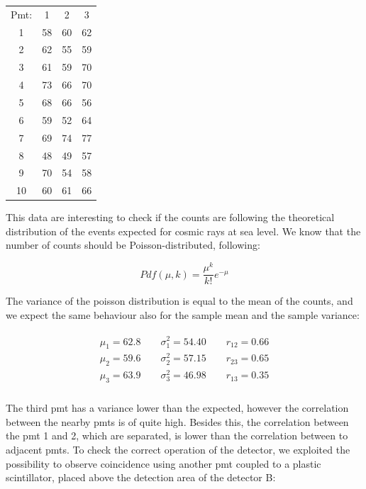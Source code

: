 \documentclass[10pt,a4paper]{article}
\begin{document}
\begin{center}
\begin{tabular}{|c|c|c|c|}
\hline 
Pmt: & 1 & 2 & 3 \\ 

1 & 58 & 60 & 62 \\ 
\hline 
2 & 62 & 55 & 59 \\ 
\hline 
3 & 61 & 59 & 70 \\ 
\hline 
4 & 73 & 66 & 70 \\ 
\hline 
5 & 68 & 66 & 56 \\ 
\hline 
6 & 59 & 52 & 64 \\ 
\hline 
7 & 69 & 74 & 77 \\ 
\hline 
8 & 48 & 49 & 57  \\ 
\hline 
9 & 70 & 54 & 58 \\ 
\hline 
10 & 60 & 61 & 66\\
\hline
\end{tabular} 

\end{center}

This data are interesting to check if the counts are following the theoretical distribution of the events expected for cosmic rays at sea level. We know that the number of counts should be Poisson-distributed, following:

\begin{equation}
Pdf(\mu,k) =  \frac{\mu^{k}}{k!} e^{-\mu}
\end{equation}

The variance of the poisson distribution is equal to the mean of the counts, and we expect the same behaviour also for the sample mean and the sample variance:

\begin{align*}
\begin{split}
\mu_{1} = 62.8	\qquad \sigma^{2}_{1} = 54.40 \qquad r_{12} = 0.66\\
\mu_{2} = 59.6	\qquad \sigma^{2}_{2} = 57.15 \qquad r_{23} = 0.65\\
\mu_{3} = 63.9	\qquad \sigma^{2}_{3} = 46.98 \qquad r_{13} = 0.35 \\
\end{split}
\end{align*}

The third pmt has a variance lower than the expected, however the correlation between the nearby pmts is of quite high. Besides this, the correlation between the pmt 1 and 2, which are separated, is lower than the correlation between to adjacent pmts. \newline
To check the correct operation of the detector, we exploited the possibility to observe coincidence using  another pmt coupled to a plastic scintillator, placed above the detection area of the detector B:
\end{document}

